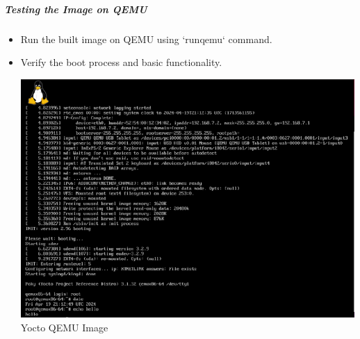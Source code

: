 \subparagraph{Testing the Image on QEMU}
\begin{itemize}
    \item Run the built image on QEMU using `runqemu` command.
    \item Verify the boot process and basic functionality.
   
       
        \includegraphics[width=1\linewidth]{Images/9_Linux_image/Yocto QEMU Image .png}
 \centering
\\
Yocto QEMU Image
        \label{fig:enter-label}

\end{itemize}
\raggedright
